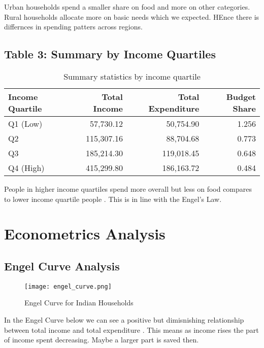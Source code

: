 \documentclass[12pt]{article}
\begin{document}
Urban households spend a smaller share on food and more on other categories. Rural households allocate more on basic needs which we expected. HEnce there is differnces in spending patters across regions.

\subsection*{Table 3: Summary by Income Quartiles}

\begin{table}[h!]
\centering
\caption{Summary statistics by income quartile}
\label{tab:income_quartiles}
\begin{tabular}{lrrr}
\toprule
\textbf{Income Quartile} & \textbf{Total Income} & \textbf{Total Expenditure} & \textbf{Budget Share} \\
\midrule
Q1 (Low)   & 57,730.12  & 50,754.90  & 1.256 \\
Q2         & 115,307.16 & 88,704.68  & 0.773 \\
Q3         & 185,214.30 & 119,018.45 & 0.648 \\
Q4 (High)  & 415,299.80 & 186,163.72 & 0.484 \\
\bottomrule
\end{tabular}
\end{table}

People in higher income quartiles spend more overall but less on food compares to lower income quartile people . This is in line with the Engel's Law.

\section{Econometrics Analysis}

\subsection*{Engel Curve Analysis}

\begin{figure}[h!]
    \centering
    \texttt{[image: engel\_curve.png]}
    \caption{Engel Curve for Indian Households}
    \label{fig:engel}
\end{figure}

In the Engel Curve below we can see a positive but dimisnishing relationship between total income and total expenditure . This means as income rises the part of income spent decreasing. Maybe a larger part is saved then.
\end{document}
